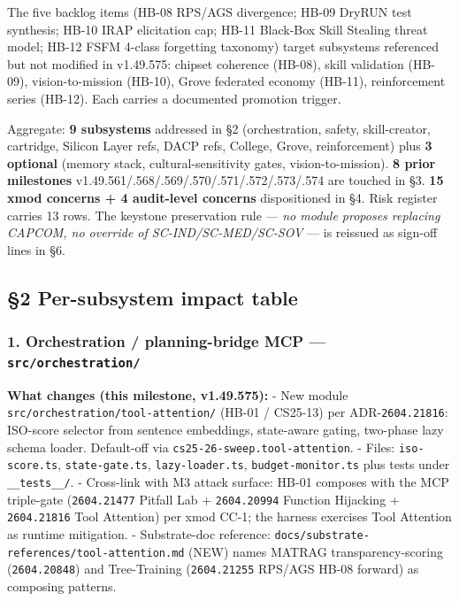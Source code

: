 \documentclass[11pt,letterpaper]{article}
\newcommand{\arxivid}[1]{\texttt{\textcolor{accent}{#1}}}
\begin{document}
The five backlog items (HB-08 RPS/AGS divergence; HB-09 DryRUN test
synthesis; HB-10 IRAP elicitation cap; HB-11 Black-Box Skill Stealing
threat model; HB-12 FSFM 4-class forgetting taxonomy) target subsystems
referenced but not modified in v1.49.575: chipset coherence (HB-08),
skill validation (HB-09), vision-to-mission (HB-10), Grove federated
economy (HB-11), reinforcement series (HB-12). Each carries a documented
promotion trigger.

Aggregate: \textbf{9 subsystems} addressed in §2 (orchestration, safety,
skill-creator, cartridge, Silicon Layer refs, DACP refs, College, Grove,
reinforcement) plus \textbf{3 optional} (memory stack,
cultural-sensitivity gates, vision-to-mission). \textbf{8 prior
milestones} v1.49.561/.568/.569/.570/.571/.572/.573/.574 are touched in
§3. \textbf{15 xmod concerns + 4 audit-level concerns} dispositioned in
§4. Risk register carries 13 rows. The keystone preservation rule ---
\emph{no module proposes replacing CAPCOM, no override of
SC-IND/SC-MED/SC-SOV} --- is reissued as sign-off lines in §6.

\subsection{§2 Per-subsystem impact
table}

\subsubsection{\texorpdfstring{1. Orchestration / planning-bridge MCP
---
\texttt{src/orchestration/}}{1. Orchestration / planning-bridge MCP --- src/orchestration/}}

\textbf{What changes (this milestone, v1.49.575):} - New module
\texttt{src/orchestration/tool-attention/} (HB-01 / CS25-13) per
ADR-\arxivid{2604.21816}: ISO-score selector from sentence embeddings, state-aware
gating, two-phase lazy schema loader. Default-off via
\texttt{cs25-26-sweep.tool-attention}. - Files: \texttt{iso-score.ts},
\texttt{state-gate.ts}, \texttt{lazy-loader.ts},
\texttt{budget-monitor.ts} plus tests under \texttt{\_\_tests\_\_/}. -
Cross-link with M3 attack surface: HB-01 composes with the MCP
triple-gate (\arxivid{2604.21477} Pitfall Lab + \arxivid{2604.20994}
Function Hijacking + \arxivid{2604.21816} Tool Attention) per xmod CC-1;
the harness exercises Tool Attention as runtime mitigation. -
Substrate-doc reference:
\texttt{docs/substrate-references/tool-attention.md} (NEW) names MATRAG
transparency-scoring (\arxivid{2604.20848}) and Tree-Training
(\arxivid{2604.21255} RPS/AGS HB-08 forward) as composing patterns.
\end{document}
